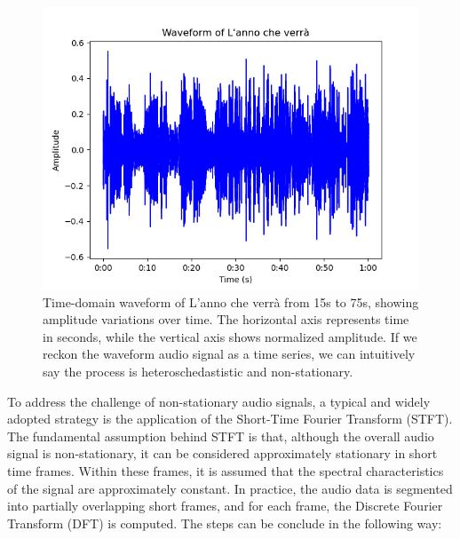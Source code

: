 \begin{figure}[H]
	\centering
	\includegraphics[width=0.9\linewidth]{../Statistical_Sciences_template/figure/Waveform.png}
	\caption{Time-domain waveform of L'anno che verrà from 15s to 75s, showing amplitude variations over time. The horizontal axis represents time in seconds, while the vertical axis shows normalized amplitude. If we reckon the waveform audio signal as a time series, we can intuitively say the process is heteroschedastistic and non-stationary.}
	\label{fig:L'anno che verrà}
\end{figure}
\noindent To address the challenge of non-stationary audio signals, a typical and widely adopted strategy is the application of the Short-Time Fourier Transform (STFT). The fundamental assumption behind STFT is that, although the overall audio signal is non-stationary, it can be considered approximately stationary in short time frames. Within these frames, it is assumed that the spectral characteristics of the signal are approximately constant. In practice, the audio data is segmented into partially overlapping short frames, and for each frame, the Discrete Fourier Transform (DFT) is computed. The steps can be conclude in the following way:\\
\\
\usetikzlibrary{arrows.meta}
\\
